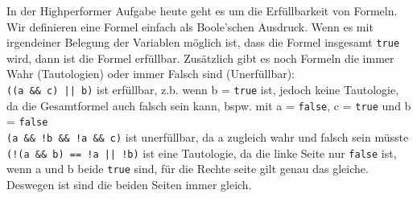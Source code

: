 \documentclass{../../sheet}
\begin{document}
\newpage
{}
In der Highperformer Aufgabe heute geht es um die Erfüllbarkeit von Formeln. Wir definieren eine Formel einfach als Boole'schen Ausdruck. Wenn es mit irgendeiner Belegung der Variablen möglich ist, dass die Formel insgesamt \texttt{true} wird, dann ist die Formel erfüllbar. Zusätzlich gibt es noch Formeln die immer Wahr (Tautologien) oder immer Falsch sind (Unerfüllbar):\\
\texttt{((a \&\& c) || b)} ist erfüllbar, z.b. wenn b = \texttt{true} ist, jedoch keine Tautologie, da die Gesamtformel auch falsch sein kann, bspw. mit a = \texttt{false}, c = \texttt{true} und b = \texttt{false}\\
\texttt{(a \&\& !b \&\& !a \&\& c)} ist unerfüllbar, da a zugleich wahr und falsch sein müsste\\
\texttt{(!(a \&\& b) == !a || !b)} ist eine Tautologie, da die linke Seite nur \texttt{false} ist, wenn a und b beide \texttt{true} sind, für die Rechte seite gilt genau das gleiche. Deswegen ist sind die beiden Seiten immer gleich.
\end{document}
